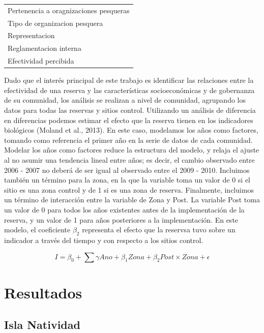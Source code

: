 \documentclass[12pt,]{article}
\begin{document}
\begin{table}
\begin{tabular}[t]{l}
\hspace{1em}Pertenencia a oragnizaciones pesqueras\\
\hspace{1em}Tipo de organizacion pesquera\\
\hspace{1em}Representacion\\
\addlinespace
\hspace{1em}Reglamentacion interna\\
Efectividad percibida\\
\bottomrule
\end{tabular}
\end{table}

Dado que el interés principal de este trabajo es identificar las
relaciones entre la efectividad de una reserva y las características
socioeconómicas y de gobernanza de su comunidad, los análisis se
realizan a nivel de comunidad, agrupando los datos para todas las
reservas y sitios control. Utilizando un análisis de diferencia en
diferencias podemos estimar el efecto que la reserva tienen en los
indicadores biológicos (Moland et al., 2013). En este caso, modelamos
los años como factores, tomando como referencia el primer año en la
serie de datos de cada comunidad. Modelar los años como factores reduce
la estructura del modelo, y relaja el ajuste al no asumir una tendencia
lineal entre años; es decir, el cambio observado entre 2006 - 2007 no
deberá de ser igual al observado entre el 2009 - 2010. Incluimos también
un término para la zona, en la que la variable toma un valor de 0 si el
sitio es una zona control y de 1 si es una zona de reserva. Finalmente,
incluimos un término de interacción entre la variable de Zona y Post. La
variable Post toma un valor de 0 para todos los años existentes antes de
la implementación de la reserva, y un valor de 1 para años posteriores a
la implementación. En este modelo, el coeficiente \(\beta_2\) representa
el efecto que la reservsa tuvo sobre un indicador a través del tiempo y
con respecto a los sitios control.

\[I = \beta_0 + \sum \gamma Ano + \beta_1 Zona + \beta_2 Post\times Zona + \epsilon\]

\section{Resultados}\label{resultados}

\subsection{Isla Natividad}\label{isla-natividad-1}
\end{document}
